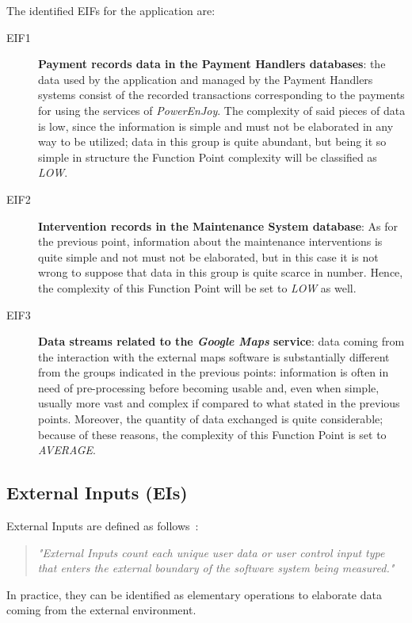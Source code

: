 The identified EIFs for the application are:
\begin{description}
\item[EIF1] \textbf{Payment records data in the Payment Handlers databases}: the data used by the application and managed by the Payment Handlers systems consist of the recorded transactions corresponding to the payments for using the services of \textit{PowerEnJoy}. The complexity of said pieces of data is low, since the information is simple and must not be elaborated in any way to be utilized; data in this group is quite abundant, but being it so simple in structure the Function Point complexity will be classified as \textit{LOW}.
\item[EIF2] \textbf{Intervention records in the Maintenance System database}: As for the previous point, information about the maintenance interventions is quite simple and not must not be elaborated, but in this case it is not wrong to suppose that data in this group is quite scarce in number. Hence, the complexity of this Function Point will be set to \textit{LOW} as well.
\item[EIF3] \textbf{Data streams related to the \textit{Google Maps} service}: data coming from the interaction with the external maps software is substantially different from the groups indicated in the previous points: information is often in need of pre-processing before becoming usable and, even when simple, usually more vast and complex if compared to what stated in the previous points. Moreover, the quantity of data exchanged is quite considerable; because of these reasons, the complexity of this Function Point is set to \textit{AVERAGE}.
\end{description}

\subsection{External Inputs (EIs)}
External Inputs are defined as follows~\cite{cocomo-manual}:
\begin{quotation}
\textit{"External Inputs count each unique user data or user control input type that enters the external boundary of the software system being measured."}
\end{quotation}
In practice, they can be identified as elementary operations to elaborate data coming from the external environment.

